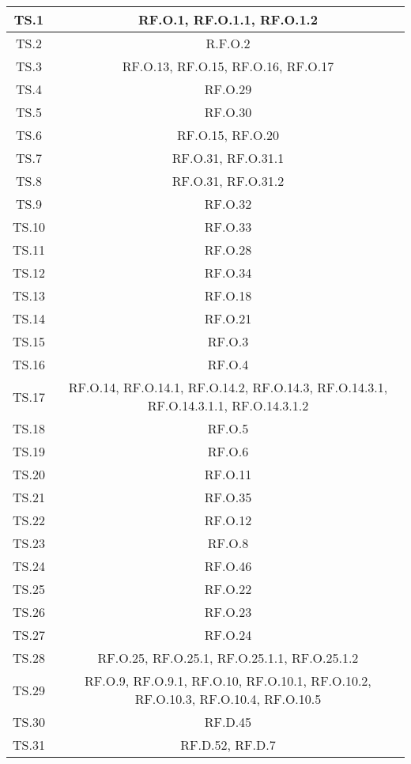 \begin{adjustwidth}{-0.5cm}{-0.5cm}
\begin{longtable}{|c|c|}
    TS.1 & RF.O.1, RF.O.1.1, RF.O.1.2\\
		\hline TS.2 & R.F.O.2\\
		\hline TS.3 & RF.O.13, RF.O.15, RF.O.16, RF.O.17\\
		\hline TS.4 & RF.O.29\\
		\hline TS.5 & RF.O.30\\
		\hline TS.6 & RF.O.15, RF.O.20\\
		\hline TS.7 & RF.O.31, RF.O.31.1\\
		\hline TS.8 & RF.O.31, RF.O.31.2\\
		\hline TS.9 & RF.O.32\\
		\hline TS.10 & RF.O.33\\
		\hline TS.11 & RF.O.28\\
		\hline TS.12 & RF.O.34\\
		\hline TS.13 & RF.O.18\\
		\hline TS.14 & RF.O.21\\
		\hline TS.15 & RF.O.3\\
		\hline TS.16 & RF.O.4\\
		\hline TS.17 & RF.O.14, RF.O.14.1, RF.O.14.2, RF.O.14.3, RF.O.14.3.1, RF.O.14.3.1.1, RF.O.14.3.1.2\\
		\hline TS.18 & RF.O.5\\
		\hline TS.19 & RF.O.6\\
		\hline TS.20 & RF.O.11\\
		\hline TS.21 & RF.O.35\\
		\hline TS.22 & RF.O.12\\
		\hline TS.23 & RF.O.8\\
		\hline TS.24 & RF.O.46\\
		\hline TS.25 & RF.O.22\\
		\hline TS.26 & RF.O.23\\
		\hline TS.27 & RF.O.24\\
		\hline TS.28 & RF.O.25, RF.O.25.1, RF.O.25.1.1, RF.O.25.1.2\\
		\hline TS.29 & RF.O.9, RF.O.9.1, RF.O.10, RF.O.10.1, RF.O.10.2, RF.O.10.3, RF.O.10.4, RF.O.10.5\\
		\hline TS.30 & RF.D.45\\
		\hline TS.31 & RF.D.52, RF.D.7\\
  \end{longtable}
\end{adjustwidth}
\egroup

